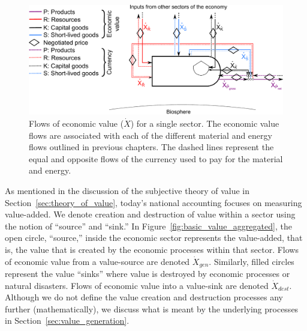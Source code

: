 \begin{figure}[!ht]
\centering
\includegraphics[width=\linewidth]{Part_2/Chapter_Values/images/PERKS_basic_unit_value_all_3.pdf}
\caption[Flows of value for a single sector]{Flows of economic value ($\dot{X}$) 
for a single sector. 
The economic value flows are associated with each of the different 
material and energy flows outlined in previous chapters. 
The dashed lines represent the equal and opposite flows of the 
currency used to pay for the 
material and energy.}
\label{fig:basic_value} 
\end{figure}

As mentioned in the discussion of the subjective theory of value 
in Section~\ref{sec:theory_of_value}, today's national accounting focuses on
measuring value-added. 
We denote creation and destruction of value within a sector 
using the notion of ``source'' and ``sink.''
In Figure~\ref{fig:basic_value_aggregated}, the open circle, 
``source,'' inside the economic sector represents the value-added,
that is, the value that is created by the economic processes within that sector. 
Flows of economic value from a value-source are denoted $\dot{X}_{gen}$. 
Similarly, filled circles represent the value ``sinks''  where value is destroyed 
by economic processes or natural disasters. 
Flows of economic value into a value-sink are denoted $\dot{X}_{dest}$. 
Although we do not define 
the value creation and destruction processes any further (mathematically), 
we discuss what is meant by the
underlying processes in Section~\ref{sec:value_generation}.

